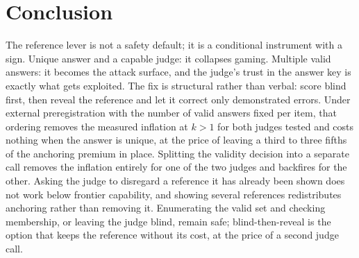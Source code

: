 \documentclass[11pt]{article}
\begin{document}
\section{Conclusion}
The reference lever is not a safety default; it is a conditional instrument with a sign.
Unique answer and a capable judge: it collapses gaming.
Multiple valid answers: it becomes the attack surface, and the judge's trust in the answer key is exactly what gets exploited.
The fix is structural rather than verbal: score blind first, then reveal the reference and let it correct only demonstrated errors.
Under external preregistration with the number of valid answers fixed per item, that ordering removes the measured inflation at $k > 1$ for both judges tested and costs nothing when the answer is unique, at the price of leaving a third to three fifths of the anchoring premium in place.
Splitting the validity decision into a separate call removes the inflation entirely for one of the two judges and backfires for the other.
Asking the judge to disregard a reference it has already been shown does not work below frontier capability, and showing several references redistributes anchoring rather than removing it.
Enumerating the valid set and checking membership, or leaving the judge blind, remain safe; blind-then-reveal is the option that keeps the reference without its cost, at the price of a second judge call.



\end{document}
